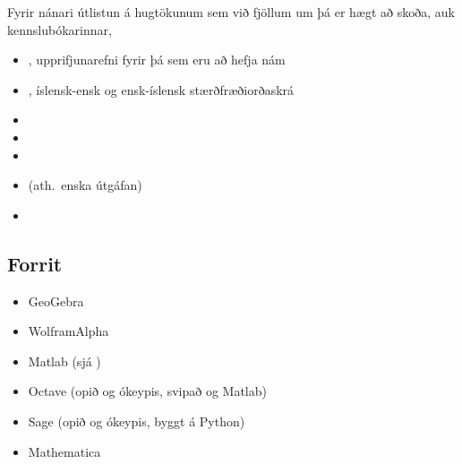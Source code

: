 \documentclass[a4paper,10pt,icelandic]{sphinxmanual}
\begin{document}
Fyrir nánari útlistun á hugtökunum sem við fjöllum um þá er hægt að skoða,
auk kennslubókarinnar,
\begin{itemize}
\item {} 
, upprifjunarefni fyrir þá sem eru að hefja nám

\item {} 
, íslensk-ensk og ensk-íslensk stærðfræðiorðaskrá

\item {} 

\item {} 

\item {} 

\item {} 
 (ath. enska útgáfan)

\item {} 

\end{itemize}


\subsection{Forrit}
\label{\detokenize{vidauki:forrit}}\begin{itemize}
\item {} 
GeoGebra 

\item {} 
WolframAlpha 

\item {} 
Matlab 
(sjá )

\item {} 
Octave  (opið og ókeypis, svipað og Matlab)

\item {} 
Sage   (opið og ókeypis, byggt á Python)

\item {} 
Mathematica 

\end{itemize}
\end{document}

